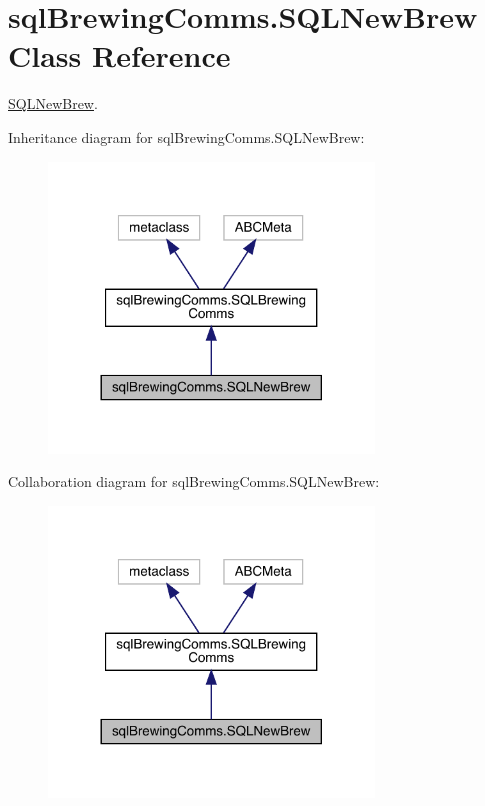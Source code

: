 \hypertarget{classsql_brewing_comms_1_1_s_q_l_new_brew}{}\section{sql\+Brewing\+Comms.\+S\+Q\+L\+New\+Brew Class Reference}
\label{classsql_brewing_comms_1_1_s_q_l_new_brew}


\mbox{\hyperlink{classsql_brewing_comms_1_1_s_q_l_new_brew}{S\+Q\+L\+New\+Brew}}.  




Inheritance diagram for sql\+Brewing\+Comms.\+S\+Q\+L\+New\+Brew\+:\nopagebreak
\begin{figure}[H]
\begin{center}
\leavevmode
\includegraphics[width=245pt]{classsql_brewing_comms_1_1_s_q_l_new_brew__inherit__graph}
\end{center}
\end{figure}


Collaboration diagram for sql\+Brewing\+Comms.\+S\+Q\+L\+New\+Brew\+:\nopagebreak
\begin{figure}[H]
\begin{center}
\leavevmode
\includegraphics[width=245pt]{classsql_brewing_comms_1_1_s_q_l_new_brew__coll__graph}
\end{center}
\end{figure}
